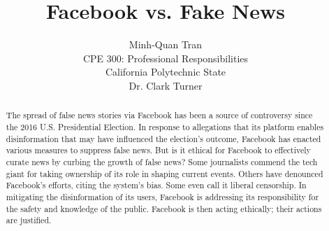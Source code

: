 

\title{\vfill Facebook vs. Fake News\\
\vspace{8pt}
\normalsize{}
}

\author{Minh-Quan Tran\\
\normalsize{CPE 300: Professional Responsibilities}\\
\normalsize{California Polytechnic State}\\
\normalsize{Dr. Clark Turner}
}

\maketitle


\vfill

\begin{abstract}
The spread of false news stories via Facebook has been a source of controversy since the 2016 U.S. Presidential Election. \cite{telegraph_fake_news} In response to allegations that its platform enables disinformation that may have influenced the election's outcome, \cite{tc_snowden_fb,stanford_fake_news_study} Facebook has enacted various measures to suppress false news. \cite{fb_reduce_clickbait,fb_addressing_hoaxes,fb_spot_fake_news} But is it ethical for Facebook to effectively curate news by curbing the growth of false news? Some journalists commend the tech giant for taking ownership of its role in shaping current events. \cite{cnn_fight} Others have denounced Facebook's efforts, citing the system's bias. \cite{vox_sentences_fn} Some even call it liberal censorship. \cite{milo_censor} In mitigating the disinformation of its users, Facebook is addressing its responsibility for the safety and knowledge of the public. \cite{se_code} Facebook is then acting ethically; their actions are justified.
\end{abstract}

\thispagestyle{empty} 
\pagebreak